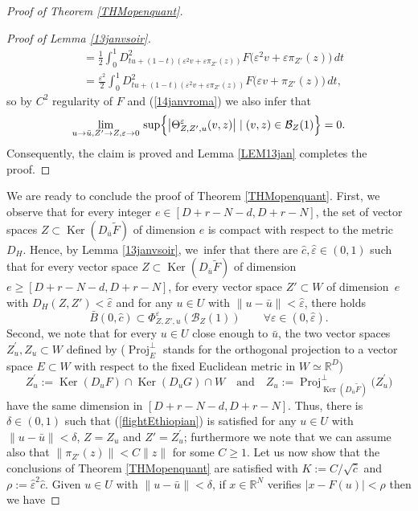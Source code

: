 \documentclass[JEP,XML,SOM,Unicode,NoFloatCountersInSection,published]{cedram}
\let\epsilon\varepsilon
\let\sep\mid
\DeclareMathOperator{\Ker}{Ker}
\DeclareMathOperator{\Proj}{Proj}
\newcommand\R{\mathbb R}
\theoremstyle{definition}
\begin{document}
\begin{proof}[Proof of Theorem \ref{THMopenquant}]
\begin{proof}[Proof of Lemma \ref{13janvsoir}]
\begin{align*}
& =  \frac{1}{2} \int_0^1 D^2_{tu+(1-t)(\epsilon^2 v+\epsilon \pi_{Z'}(z))} F \bigl(\epsilon^2 v+\epsilon \pi_{Z'}(z)\bigr) \, dt\\
& =  \frac{\epsilon^2}{2} \int_0^1 D^2_{tu+(1-t)(\epsilon^2 v+\epsilon \pi_{Z'}(z))} F \bigl(\epsilon v+ \pi_{Z'}(z)\bigr) \, dt,
\end{align*}
so by $C^2$ regularity of $F$ and (\ref{14janvroma}) we also infer that
\[
\lim_{u \to \bar{u}, Z' \to Z, \epsilon\to 0} \, \sup \Bigl\{ \left| \Theta^{\epsilon}_{Z,Z',u}(v,z) \right| \sep  (v,z) \in \mathcal{B}_Z(1) \Bigr\} =0.
\]
Consequently, the claim is proved and Lemma \ref{LEM13jan} completes the proof.
\end{proof}

We are ready to conclude the proof of Theorem \ref{THMopenquant}. First, we observe that for every integer $e\in [D+r-N-d,D+r-N]$, the set of vector spaces $Z \subset \Ker (D_{\bar{u}} \tilde{F})$ of dimension $e$ is compact with respect to the metric $D_H$. Hence, by Lemma \ref{13janvsoir}, we~infer that there are $\hat{c}, \hat{\epsilon}\in (0,1)$ such that for every vector space $Z\subset \Ker (D_{\bar{u}} \tilde{F})$ of dimension $e\geq [D+r-N-d,D+r-N]$, for every vector space $Z'\subset W$ of dimension~$e$ with $D_H(Z,Z')< \hat{\epsilon}$ and for any $u\in U$ with $\|u-\bar{u}\|<\hat{\epsilon}$, there holds
\begin{equation}\label{flightEthiopian}
\bar{B}(0,\hat{c})\subset \Phi_{Z,Z',u}^{\epsilon} \left(\mathcal{B}_Z(1)\right) \qquad \forall \epsilon \in (0,\hat{\epsilon}).
\end{equation}
Second, we note that for every $u \in U$ close enough to $\bar{u}$, the two vector spaces $Z^{\prime}_u, Z_u\subset W$ defined by ($\Proj^{\perp}_{E}$ stands for the orthogonal projection to a vector space $E\subset W$ with respect to the fixed Euclidean metric in $W\simeq \R^D$)
\[
Z^{\prime}_{u}:=\Ker \left(D_uF\right) \cap \Ker \left(D_uG\right) \cap W \quad \text{and} \quad Z_{u}:= \Proj^{\perp}_{\Ker(D_{\bar{u}}\tilde{F})} \bigl(Z^{\prime}_u\bigr)
\]
have the same dimension in $ [D+r-N-d,D+r-N]$. Thus, there is $\delta \in (0,1)$ such that (\ref{flightEthiopian}) is satisfied for any $u\in U$ with $\|u-\bar{u}\|<\delta$, $Z=Z_{u}$ and $Z'=Z^{\prime}_{u}$; furthermore we note that we can assume also that $\|\pi_{Z'}(z)\|<C\|z\|$ for some $C\geq 1$. Let us now show that the conclusions of Theorem \ref{THMopenquant} are satisfied with $K:=C/\sqrt{\hat{c}}$ and $\rho:=\hat{\epsilon}^2\hat{c}$. Given $u\in U$ with $\|u-\bar{u}\|<\delta$, if $x\in \R^N$ verifies $|x-F(u)|< \rho$ then we have

\end{proof}
\end{document}
